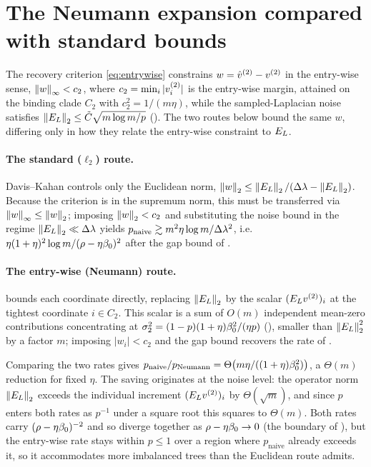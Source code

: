\section{The Neumann expansion compared with standard bounds}\label{app:compare}

The recovery criterion \eqref{eq:entrywise} constrains $w=\hat v^{(2)}-v^{(2)}$ in the
entry-wise sense, $\left\lVert w \right\rVert_\infty<c_2$, where $c_2=\min_i|v^{(2)}_i|$ is the
entry-wise margin, attained on the binding clade $C_2$ with $c_2^2=1/(m\eta)$, while
the sampled-Laplacian noise satisfies $\left\lVert E_{L} \right\rVert_{2}\le\tilde C\sqrt{m\log
m/p}$ (). The two routes below bound the same $w$, differing
only in how they relate the entry-wise constraint to $E_{L}$.

\paragraph{The standard ($\ell_2$) route.} Davis--Kahan controls only the Euclidean
norm, $\left\lVert w \right\rVert_2\le\left\lVert E_{L} \right\rVert_{2}/(\Delta\lambda-\left\lVert E_{L} \right\rVert_{2})$. Because the criterion is in
the supremum norm, this must be transferred via $\left\lVert w \right\rVert_\infty\le\left\lVert w \right\rVert_2$;
imposing $\left\lVert w \right\rVert_2<c_2$ and substituting the noise bound in the regime
$\left\lVert E_{L} \right\rVert_{2}\ll\Delta\lambda$ yields $p_{\mathrm{naive}}\gtrsim m^2\eta\log m/\Delta\lambda^2$,
i.e.\ $\eta(1+\eta)^2\log m/(\rho-\eta\beta_0)^2$ after the gap bound of .

\paragraph{The entry-wise (Neumann) route.}  bounds each
coordinate directly, replacing $\left\lVert E_{L} \right\rVert_{2}$ by the scalar $(E_{L}v^{(2)})_i$ at the
tightest coordinate $i\in C_2$. This scalar is a sum of $O(m)$ independent mean-zero
contributions concentrating at $\sigma_2^2=(1-p)(1+\eta)\beta_0^2/(\eta p)$
(), smaller than $\left\lVert E_{L} \right\rVert_{2}^2$ by a factor $m$; imposing
$|w_i|<c_2$ and the gap bound recovers the rate of .

\begin{remark}\label{rem:E-compare}
Comparing the two rates gives
$p_{\mathrm{naive}}/p_{\mathrm{Neumann}}=\Theta\bigl(m\eta/((1+\eta)\beta_0^2)\bigr)$,
a $\Theta(m)$
reduction for fixed $\eta$. The saving originates at the noise level: the operator
norm $\left\lVert E_{L} \right\rVert_{2}$ exceeds the individual increment $(E_{L}v^{(2)})_i$ by
$\Theta(\sqrt m)$, and since $p$ enters both rates as $p^{-1}$ under a square root
this squares to $\Theta(m)$. Both rates carry $(\rho-\eta\beta_0)^{-2}$ and so
diverge together as $\rho-\eta\beta_0\to0$ (the boundary of ), but the
entry-wise rate stays within $p\le1$ over a region where $p_{\mathrm{naive}}$
already exceeds it, so it accommodates more imbalanced trees than the Euclidean
route admits.
\end{remark}
